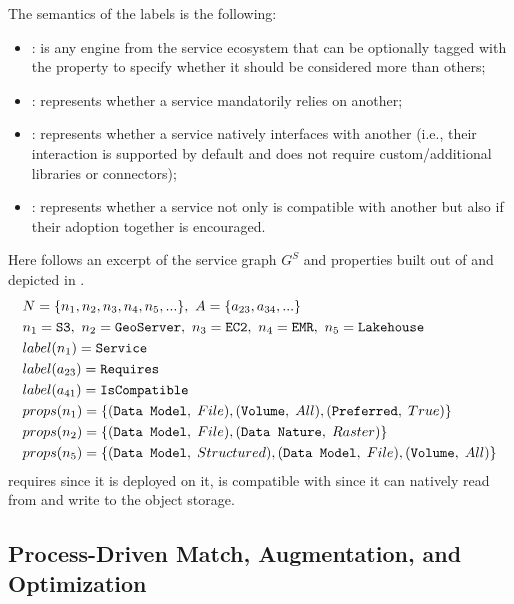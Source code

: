 The semantics of the labels is the following:
\begin{itemize}
    \item {}: is any engine from the service ecosystem that can be optionally tagged with the property  to specify whether it should be considered more than others;
    \item {}: represents whether a service mandatorily relies on another;
    \item {}: represents whether a service natively interfaces with another (i.e., their interaction is supported by default and does not require custom/additional libraries or connectors);
    \item {}: represents whether a service not only is compatible with another but also if their adoption together is encouraged.
\end{itemize}

\begin{example}
Here follows an excerpt of the service graph $G^S$ and properties built out of  and depicted in .
\begin{align*}
&N = \{n_1, n_2, n_3, n_4, n_5,...\}, ~
A =\{a_{23}, a_{34}, ...\}\\
&n_1 = \texttt{\textup{S3}},~n_2=\texttt{\textup{GeoServer}},~n_3=\texttt{\textup{EC2}},~n_4=\texttt{\textup{EMR}}
,~n_5 = \texttt{\textup{Lakehouse}}
\\
&label(n_1) = \texttt{Service}\\
&label(a_{23}) = \texttt{Requires}\\
&label(a_{41}) = \texttt{IsCompatible}\\
&props(n_1) = \{(\texttt{Data Model},\;File),(\texttt{Volume},\;All), (\texttt{Preferred},\;True)\}\\
&props(n_2) = \{(\texttt{Data Model},\;File),(\texttt{Data Nature},\;Raster)\}\\
&
props(n_5)=\{(\texttt{Data Model},\;Structured),(\texttt{Data Model},\;File),(\texttt{Volume},\;All)\}
\end{align*}
 requires  since it is deployed on it,  is compatible with  since it can natively read from and write to the object storage.
\end{example}

\subsection{Process-Driven Match, Augmentation, and Optimization}
\label{sec:pdd-process}

